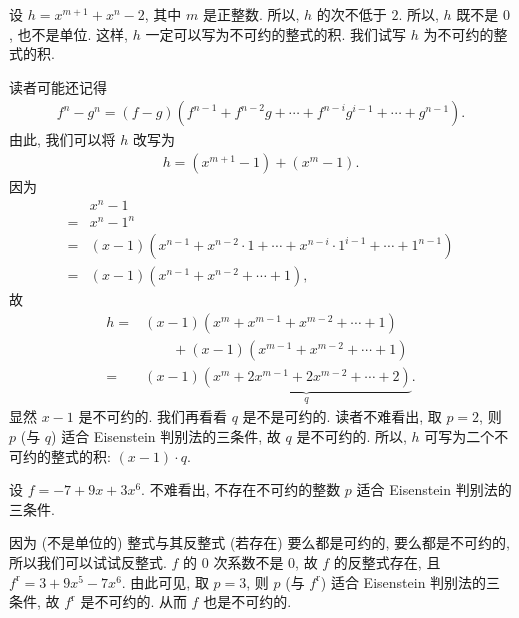 \begin{example}
    设 $h = x^{m+1} + x^n - 2$, 其中 $m$ 是正整数. 所以, $h$ 的次不低于 $2$. 所以, $h$ 既不是 $0$, 也不是单位. 这样, $h$ 一定可以写为不可约的整式的积. 我们试写 $h$ 为不可约的整式的积.

    读者可能还记得
    \begin{align*}
        f^n - g^n = (f - g)(f^{n-1} + f^{n-2} g + \cdots + f^{n-i} g^{i-1} + \cdots + g^{n-1}).
    \end{align*}
    由此, 我们可以将 $h$ 改写为
    \begin{align*}
        h = (x^{m+1} - 1) + (x^m - 1).
    \end{align*}
    因为
    \begin{align*}
             & x^n - 1                                                                                \\
        = {} & x^n - 1^n                                                                              \\
        = {} & (x - 1)(x^{n-1} + x^{n-2} \cdot 1 + \cdots + x^{n-i} \cdot 1^{i-1} + \cdots + 1^{n-1}) \\
        = {} & (x - 1)(x^{n-1} + x^{n-2} + \cdots + 1),
    \end{align*}
    故
    \begin{align*}
        h
        = {} & (x - 1)(x^m + x^{m-1} + x^{m-2} + \cdots + 1)                     \\
             & \qquad + (x - 1)(x^{m-1} + x^{m-2} + \cdots + 1)                  \\
        = {} & (x - 1)\underbrace{(x^m + 2x^{m-1} + 2x^{m-2} + \cdots + 2)}_{q}.
    \end{align*}
    显然 $x-1$ 是不可约的. 我们再看看 $q$ 是不是可约的. 读者不难看出, 取 $p = 2$, 则 $p$ (与 $q$) 适合 Eisenstein 判别法的三条件, 故 $q$ 是不可约的. 所以, $h$ 可写为二个不可约的整式的积: $(x - 1) \cdot q$.
\end{example}

\begin{example}
    设 $f = -7 + 9x + 3x^6$. 不难看出, 不存在不可约的整数 $p$ 适合 Eisenstein 判别法的三条件.

    因为 (不是单位的) 整式与其反整式 (若存在) 要么都是可约的, 要么都是不可约的, 所以我们可以试试反整式. $f$ 的 $0$ 次系数不是 $0$, 故 $f$ 的反整式存在, 且 $f^{\mathrm{r}} = 3 + 9x^5 - 7x^6$. 由此可见, 取 $p = 3$, 则 $p$ (与 $f^{\mathrm{r}}$) 适合 Eisenstein 判别法的三条件, 故 $f^{\mathrm{r}}$ 是不可约的. 从而 $f$ 也是不可约的.
\end{example}

